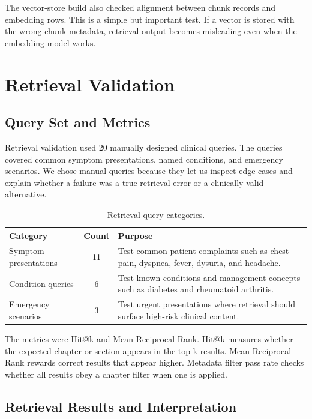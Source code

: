 The vector-store build also checked alignment between chunk records and embedding rows. This is a simple but important test. If a vector is stored with the wrong chunk metadata, retrieval output becomes misleading even when the embedding model works.

\section{Retrieval Validation}

\subsection{Query Set and Metrics}

Retrieval validation used 20 manually designed clinical queries. The queries covered common symptom presentations, named conditions, and emergency scenarios. We chose manual queries because they let us inspect edge cases and explain whether a failure was a true retrieval error or a clinically valid alternative.

\begin{table}[htbp]
\centering
\caption{Retrieval query categories.}
\label{tab:retrieval_query_categories}
\begin{tabular}{p{} c p{}}
\toprule
\textbf{Category} & \textbf{Count} & \textbf{Purpose}\\
\midrule
Symptom presentations & 11 & Test common patient complaints such as chest pain, dyspnea, fever, dysuria, and headache.\\
Condition queries & 6 & Test known conditions and management concepts such as diabetes and rheumatoid arthritis.\\
Emergency scenarios & 3 & Test urgent presentations where retrieval should surface high-risk clinical content.\\
\bottomrule
\end{tabular}
\end{table}

The metrics were Hit@k and Mean Reciprocal Rank. Hit@k measures whether the expected chapter or section appears in the top k results. Mean Reciprocal Rank rewards correct results that appear higher. Metadata filter pass rate checks whether all results obey a chapter filter when one is applied.

\subsection{Retrieval Results and Interpretation}

